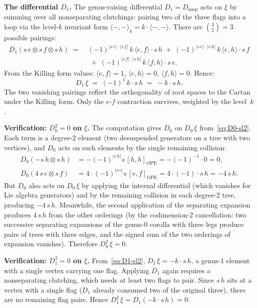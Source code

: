 \begin{example}
\medskip\noindent
\textbf{The differential $D_1$.}
The genus-raising differential $D_1 = D_{\mathrm{nsep}}$ acts
on $\xi$ by summing over all nonseparating clutchings: pairing
two of the three flags into a loop via the level-$k$ invariant
form $\langle -, - \rangle_k = k \cdot \langle -, - \rangle$.
There are $\binom{3}{2} = 3$ possible pairings:
\begin{align*}
D_1(s\,e \otimes s\,f \otimes s\,h)
\;=\;&
(-1)^{|s\,e| \cdot |s\,f|}
\,k\,\langle e, f \rangle \cdot s\,h
\;+\;
(-1)^{|s\,e| \cdot |s\,h|}
\,k\,\langle e, h \rangle \cdot s\,f \\
&\;+\;
(-1)^{|s\,f| \cdot |s\,h|}
\,k\,\langle f, h \rangle \cdot s\,e.
\end{align*}
From the Killing form values:
$\langle e, f \rangle = 1$,
$\langle e, h \rangle = 0$,
$\langle f, h \rangle = 0$. Hence:
\begin{equation}\label{eq:D1-sl2}
D_1\,\xi
\;=\;
(-1)^{1}\, k \cdot s\,h
\;=\;
-k \cdot s\,h.
\end{equation}
The two vanishing pairings reflect the orthogonality of
root spaces to the Cartan under the Killing form. Only
the $e$-$f$ contraction survives, weighted by the level~$k$.

\medskip\noindent
\textbf{Verification: $D_0^2 = 0$ on $\xi$.}
The computation gives $D_0$ on $D_0\,\xi$
from~\eqref{eq:D0-sl2}. Each term is a degree-$2$ element
(two desuspended generators on a tree with two vertices), and
$D_0$ acts on such elements by the single remaining collision:
\begin{align*}
D_0(-s\,h \otimes s\,h)
&= -(-1)^{|s\,h|}s\,[h,h]_{\mathrm{OPE}}
= -(-1)^{-1}\cdot 0 = 0, \\
D_0(4\, s\,e \otimes s\,f)
&= 4 \cdot (-1)^{|s\,e|} s\,[e,f]_{\mathrm{OPE}}
= 4 \cdot (-1) \cdot s\,h = -4\,s\,h.
\end{align*}
But $D_0$ also acts on $D_0\,\xi$ by applying the internal
differential (which vanishes for Lie algebra generators) and
by the remaining collision in each degree-$2$ tree, producing
$-4\, s\,h$. Meanwhile, the second application of the separating
expansion produces $4\, s\,h$ from the
other orderings (by the codimension-$2$ cancellation: two
successive separating expansions of the genus-$0$ corolla with
three legs produce pairs of trees with three edges,
and the signed sum of the two orderings of expansion vanishes).
Therefore $D_0^2\,\xi = 0$.

\medskip\noindent
\textbf{Verification: $D_1^2 = 0$ on $\xi$.}
From~\eqref{eq:D1-sl2}, $D_1\,\xi = -k \cdot s\,h$, a
genus-$1$ element with a single vertex carrying one flag.
Applying $D_1$ again requires a nonseparating clutching, which
needs at least two flags to pair. Since $s\,h$ sits at a
vertex with a single flag ($D_1$ already consumed two of the
original three), there are no remaining flag pairs. Hence
$D_1^2\,\xi = D_1(-k \cdot s\,h) = 0$.


\end{example}
